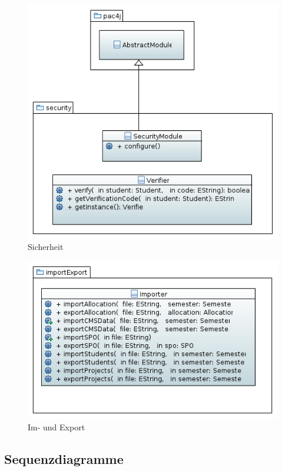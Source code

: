 \documentclass[parskip=full]{scrartcl}
\begin{document}
\begin{figure}
\centering
\includegraphics[width=\linewidth]{bilder/security.png}
\caption{Sicherheit}
\label{uml:Sicherheit}
\end{figure}

\begin{figure}
\centering
\includegraphics[width=\linewidth]{bilder/importExport.png}
\caption{Im- und Export}
\label{uml:imExport}
\end{figure}


\subsection{Sequenzdiagramme}
\end{document}
